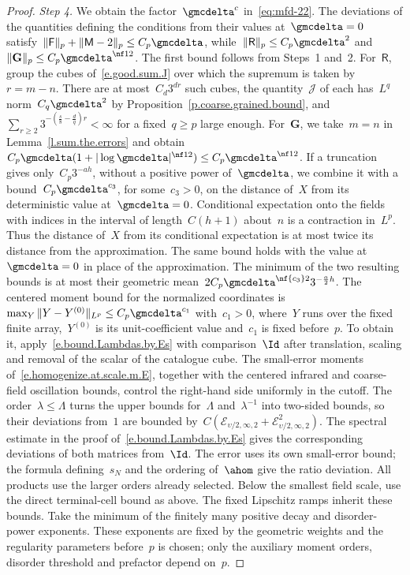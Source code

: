 \documentclass[11pt]{amsart}
\begin{document}
\begin{proof}
\emph{Step 4.} We obtain the factor~$\gmcdelta^c$ in~\eqref{eq:mfd-22}. The deviations of the quantities defining the conditions from their values at~$\gmcdelta=0$ satisfy~$\|\mathsf F\|_p+\|\mathsf M-2\|_p\leq C_p\gmcdelta$, while~$\|\mathsf R\|_p\leq C_p\gmcdelta^2$ and~$\|\mathbf G\|_p\leq C_p\gmcdelta^{\nf12}$. The first bound follows from Steps~1 and~2. For~$\mathsf R$, group the cubes of~\eqref{e.good.sum.J} over which the supremum is taken by~$r=m-n$. There are at most~$C_d3^{dr}$ such cubes, the quantity~$\mathcal J$ of each has~$L^q$ norm~$C_q\gmcdelta^2$ by Proposition~\ref{p.coarse.grained.bound}, and~$\sum_{r\geq2}3^{-(\frac s8-\frac dq)r}<\infty$ for a fixed~$q\geq p$ large enough. For~$\mathbf G$, we take~$m=n$ in Lemma~\ref{l.sum.the.errors} and obtain~$C_p\gmcdelta(1+|\log\gmcdelta|^{\nf12})\leq C_p\gmcdelta^{\nf12}$. If a truncation gives only~$C_p3^{-ah}$, without a positive power of~$\gmcdelta$, we combine it with a bound~$C_p\gmcdelta^{c_3}$, for some~$c_3>0$, on the distance of~$X$ from its deterministic value at~$\gmcdelta=0$. Conditional expectation onto the fields with indices in the interval of length~$C(h+1)$ about~$n$ is a contraction in~$L^p$. Thus the distance of~$X$ from its conditional expectation is at most twice its distance from the approximation. The same bound holds with the value at~$\gmcdelta=0$ in place of the approximation. The minimum of the two resulting bounds is at most their geometric mean~$2C_p\gmcdelta^{\nf {c_3}2}3^{-\frac{a}{2}h}$. The centered moment bound for the normalized coordinates is~$\max_{Y}\|Y-Y^{(0)}\|_{L^p}\leq C_p\gmcdelta^{c_1}$ with~$c_1>0$, where~$Y$ runs over the fixed finite array,~$Y^{(0)}$ is its unit-coefficient value and~$c_1$ is fixed before~$p$. To obtain it, apply~\eqref{e.bound.Lambdas.by.Es} with comparison~$\Id$ after translation, scaling and removal of the scalar of the catalogue cube. The small-error moments of~\eqref{e.homogenize.at.scale.m.E}, together with the centered infrared and coarse-field oscillation bounds, control the right-hand side uniformly in the cutoff. The order~$\lambda\leq\Lambda$ turns the upper bounds for~$\Lambda$ and~$\lambda^{-1}$ into two-sided bounds, so their deviations from~$1$ are bounded by~$C(\mathcal E_{\upsilon/2,\infty,2}+\mathcal E_{\upsilon/2,\infty,2}^2)$. The spectral estimate in the proof of~\eqref{e.bound.Lambdas.by.Es} gives the corresponding deviations of both matrices from~$\Id$. The error uses its own small-error bound; the formula defining~$s_N$ and the ordering of~$\ahom$ give the ratio deviation. All products use the larger orders already selected. Below the smallest field scale, use the direct terminal-cell bound as above. The fixed Lipschitz ramps inherit these bounds. Take the minimum of the finitely many positive decay and disorder-power exponents. These exponents are fixed by the geometric weights and the regularity parameters before~$p$ is chosen; only the auxiliary moment orders, disorder threshold and prefactor depend on~$p$.
\end{proof}
\end{document}
